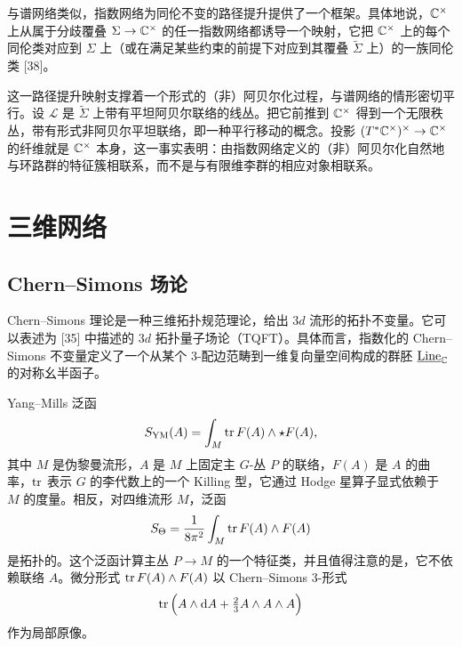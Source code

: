 与谱网络类似，指数网络为同伦不变的路径提升提供了一个框架。具体地说，$\mathbb{C}^\times$ 上从属于分歧覆叠 $\Sigma\to\mathbb{C}^\times$ 的任一指数网络都诱导一个映射，它把 $\mathbb{C}^\times$ 上的每个同伦类对应到 $\Sigma$ 上（或在满足某些约束的前提下对应到其覆叠 $\widetilde{\Sigma}$ 上）的一族同伦类 [38]。

这一路径提升映射支撑着一个形式的（非）阿贝尔化过程，与谱网络的情形密切平行。设 $\mathcal{L}$ 是 $\widetilde{\Sigma}$ 上带有平坦阿贝尔联络的线丛。把它前推到 $\mathbb{C}^\times$ 得到一个无限秩丛，带有形式非阿贝尔平坦联络，即一种平行移动的概念。投影 $(T^*\mathbb{C}^\times)^\times\to\mathbb{C}^\times$ 的纤维就是 $\mathbb{C}^\times$ 本身，这一事实表明：由指数网络定义的（非）阿贝尔化自然地与环路群的特征簇相联系，而不是与有限维李群的相应对象相联系。

\chapter{三维网络}


\section{Chern–Simons 场论}

Chern–Simons 理论是一种三维拓扑规范理论，给出 $3d$ 流形的拓扑不变量。它可以表述为 [35] 中描述的 $3d$ 拓扑量子场论（TQFT）。具体而言，指数化的 Chern–Simons 不变量定义了一个从某个 3-配边范畴到一维复向量空间构成的群胚 $\underline{\mathrm{Line}}_{\mathbb{C}}$ 的对称幺半函子。

\begin{remark}[24.1]
Yang–Mills 泛函
\[
S_{\mathrm{YM}}(A)=\int_M \operatorname{tr} F(A)\wedge\star F(A),
\]
其中 $M$ 是伪黎曼流形，$A$ 是 $M$ 上固定主 $G$-丛 $P$ 的联络，$F(A)$ 是 $A$ 的曲率，$\operatorname{tr}$ 表示 $G$ 的李代数上的一个 Killing 型，它通过 Hodge 星算子显式依赖于 $M$ 的度量。相反，对四维流形 $M$，泛函
\[
S_\Theta=\frac{1}{8\pi^2}\int_M \operatorname{tr} F(A)\wedge F(A)
\]
是拓扑的。这个泛函计算主丛 $P\to M$ 的一个特征类，并且值得注意的是，它不依赖联络 $A$。微分形式 $\operatorname{tr} F(A)\wedge F(A)$ 以 Chern–Simons 3-形式
\[
\operatorname{tr}\Big(A\wedge \mathrm{d} A+\tfrac{2}{3}A\wedge A\wedge A\Big)
\]
作为局部原像。
\end{remark}

